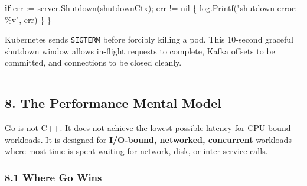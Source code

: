 \documentclass[
]{article}
\newenvironment{Shaded}{}{}
\newcommand{\ControlFlowTok}[1]{\textcolor[rgb]{0.00,0.44,0.13}{\textbf{#1}}}
\newcommand{\NormalTok}[1]{#1}
\newcommand{\OperatorTok}[1]{\textcolor[rgb]{0.40,0.40,0.40}{#1}}
\newcommand{\OtherTok}[1]{\textcolor[rgb]{0.00,0.44,0.13}{#1}}
\newcommand{\StringTok}[1]{\textcolor[rgb]{0.25,0.44,0.63}{#1}}
\begin{document}
\begin{Shaded}
\begin{Highlighting}[]
    \ControlFlowTok{if}\NormalTok{ err }\OperatorTok{:=}\NormalTok{ server}\OperatorTok{.}\NormalTok{Shutdown}\OperatorTok{(}\NormalTok{shutdownCtx}\OperatorTok{);}\NormalTok{ err }\OperatorTok{!=} \OtherTok{nil} \OperatorTok{\{}
\NormalTok{        log}\OperatorTok{.}\NormalTok{Printf}\OperatorTok{(}\StringTok{"shutdown error: \%v"}\OperatorTok{,}\NormalTok{ err}\OperatorTok{)}
    \OperatorTok{\}}
\OperatorTok{\}}
\end{Highlighting}
\end{Shaded}

Kubernetes sends \texttt{SIGTERM} before forcibly killing a pod. This
10-second graceful shutdown window allows in-flight requests to
complete, Kafka offsets to be committed, and connections to be closed
cleanly.

\begin{center}\rule{0.5\linewidth}{0.5pt}\end{center}

\hypertarget{the-performance-mental-model}{%
\subsection{8. The Performance Mental
Model}\label{the-performance-mental-model}}

Go is not C++. It does not achieve the lowest possible latency for
CPU-bound workloads. It is designed for \textbf{I/O-bound, networked,
concurrent} workloads where most time is spent waiting for network,
disk, or inter-service calls.

\hypertarget{where-go-wins}{%
\subsubsection{8.1 Where Go Wins}\label{where-go-wins}}
\end{document}
